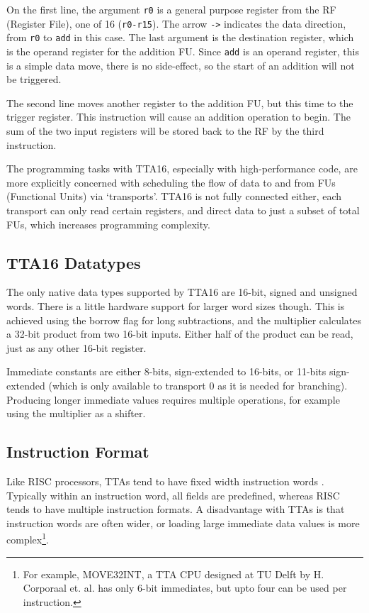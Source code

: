 On the first line, the argument \texttt{r0} is a general purpose register
from the RF (Register File), one of 16 (\texttt{r0-r15}). The arrow \texttt{->}
indicates the data direction, from \texttt{r0} to \texttt{add} in this case.
The last argument is the destination register, which is the operand register
for the addition FU. Since \texttt{add} is an operand register, this is a
simple data move, there is no side-effect, so the start of an addition will not
be triggered.

The second line moves another register to the addition FU, but this time to the
trigger register. This instruction will cause an addition operation to begin.
The sum of the two input registers will be stored back to the RF by the third
instruction.

The programming tasks with TTA16, especially with high-performance
code, are more explicitly concerned with scheduling the flow of data to and from
FUs (Functional Units) via `transports'. TTA16 is not fully connected either,
each transport can only read certain registers, and direct data to just a subset
of total FUs, which increases programming complexity. 


\subsection{TTA16 Datatypes}
The only native data types supported by TTA16 are 16-bit, signed and unsigned
words. There is a little hardware support for larger word sizes though. This
is achieved using the borrow flag for long subtractions, and the multiplier
calculates a 32-bit product from two 16-bit inputs. Either half of the product
can be read, just as any other 16-bit register.

Immediate constants are either 8-bits, sign-extended to 16-bits, or 11-bits
sign-extended (which is only available to transport 0 as it is needed for
branching). Producing longer immediate values requires multiple operations, for
example using the multiplier as a shifter.


\subsection{Instruction Format}

Like RISC processors, TTAs tend to have fixed width instruction words
\cite{corporaal1993maa}. Typically within an instruction word, all fields are
predefined, whereas RISC tends to have multiple instruction
formats\cite{SPARC_Arch,smith1994paa,britton2004mal,ARM_Cortex_M3}. A
disadvantage with TTAs is that instruction words are often wider, or loading
large immediate data values is more complex\footnote{For example, MOVE32INT, a
TTA CPU designed at TU Delft by H. Corporaal et. al. has only 6-bit immediates,
but upto four can be used per instruction\cite{corporaal1993maa}.}.

